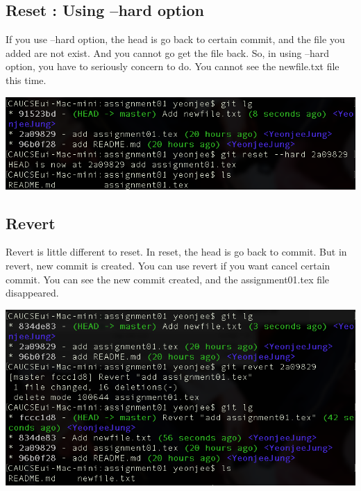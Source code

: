 \documentclass{article}
\begin{document}
\subsection{Reset : Using --hard option}

If you use --hard option, the head is go back to certain commit, and the file you added are not exist. And you cannot go get the file back. So, in using --hard option, you have to seriously concern to do. You cannot see the newfile.txt file this time.
\begin{center}
    \includegraphics[scale = 0.5]{pic/pic16.png}
\end{center}

\subsection{Revert}

Revert is little different to reset. In reset, the head is go back to commit. But in revert, new commit is created. You can use revert if you want cancel certain commit. You can see the new commit created, and the assignment01.tex file disappeared.
\begin{center}
    \includegraphics[scale = 0.5]{pic/pic17.png}
\end{center}
\end{document}
